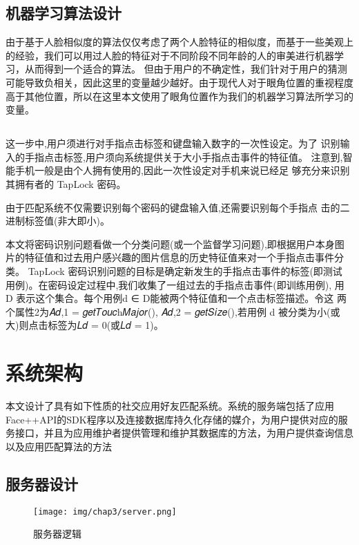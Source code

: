 \subsection{机器学习算法设计}
由于基于人脸相似度的算法仅仅考虑了两个人脸特征的相似度，而基于一些美观上的经验，我们可以用过人脸的特征对于不同阶段不同年龄的人的审美进行机器学习，从而得到一个适合的算法。
但由于用户的不确定性，我们针对于用户的猜测可能导致负相关，因此这里的变量越少越好。由于现代人对于眼角位置的重视程度高于其他位置，所以在这里本文使用了眼角位置作为我们的机器学习算法所学习的变量。
\subsection{}





这一步中,用户须进行对手指点击标签和键盘输入数字的一次性设定。为了 识别输入的手指点击标签,用户须向系统提供关于大小手指点击事件的特征值。 注意到,智能手机一般是由个人拥有使用的,因此一次性设定对手机来说已经足 够充分来识别其拥有者的 TapLock 密码。



由于匹配系统不仅需要识别每个密码的键盘输入值,还需要识别每个手指点 击的二进制标签值(非大即小)。

本文将密码识别问题看做一个分类问题(或一个监督学习问题),即根据用户本身图片的特征值和过去用户感兴趣的图片信息的历史特征值来对一个手指点击事件分类。
TapLock 密码识别问题的目标是确定新发生的手指点击事件的标签(即测试 用例)。在密码设定过程中,我们收集了一组过去的手指点击事件(即训练用例), 用 D 表示这个集合。每个用例d ∈ D能被两个特征值和一个点击标签描述。令这 两个属性2为𝐴𝑑,1 = 𝑔𝑒𝑡𝑇𝑜𝑢𝑐h𝑀𝑎𝑗𝑜𝑟(), 𝐴𝑑,2 = 𝑔𝑒𝑡𝑆𝑖𝑧𝑒(),若用例 d 被分类为小(或 大)则点击标签为𝐿𝑑 = 0(或𝐿𝑑 = 1)。

\section{系统架构}
本文设计了具有如下性质的社交应用好友匹配系统。系统的服务端包括了应用Face++API的SDK程序以及连接数据库持久化存储的媒介，为用户提供对应的服务接口，并且为应用维护者提供管理和维护其数据库的方法，为用户提供查询信息以及应用匹配算法的方法
\subsection{服务器设计}
\begin{figure}[h]
\centering
\texttt{[image: img/chap3/server.png]}
\caption{服务器逻辑\label{Face++API}}
\end{figure}



